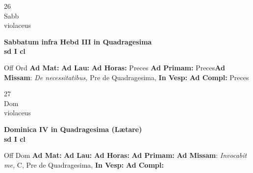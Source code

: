 \documentclass[10pt, openany]{book}
\begin{document}
    \begin{center}
        \begin{minipage}{3.5in}
            \vspace{2em}
            \begin{minipage}{0.5in}
                {\Huge 26} \\
                {\normalsize Sabb} \\
                {\normalsize violaceus}
            \end{minipage}
            \begin{minipage}{3.0in}
                \textbf{ \large Sabbatum infra Hebd III in Quadragesima \\
                \textnormal{\normalsize sd I cl}} \\ 
            \end{minipage}
            \begin{justify}Off Ord
                \textbf{Ad Mat: }
                \textbf{Ad Lau: }
                \textbf{Ad Horas: }Preces
                \textbf{Ad Primam: }Preces\textbf{Ad Missam}: \textit{De necessitatibus,} Pre de Quadragesima,  
                \textbf{In Vesp: }
                \textbf{Ad Compl: }Preces
            \end{justify}
        \end{minipage}
    \end{center}

    \begin{center}
        \begin{minipage}{3.5in}
            \vspace{2em}
            \begin{minipage}{0.5in}
                {\Huge 27} \\
                {\normalsize Dom} \\
                {\normalsize violaceus}
            \end{minipage}
            \begin{minipage}{3.0in}
                \textbf{ \large Dominica IV in Quadragesima (Lætare) \\
                \textnormal{\normalsize sd I cl}} \\ 
            \end{minipage}
            \begin{justify}Off Dom
                \textbf{Ad Mat: }
                \textbf{Ad Lau: }
                \textbf{Ad Horas: }
                \textbf{Ad Primam: }\textbf{Ad Missam}: \textit{Invocabit me,} C, Pre de Quadragesima,  
                \textbf{In Vesp: }
                \textbf{Ad Compl: }
            \end{justify}
        \end{minipage}
    \end{center}
\end{document}
